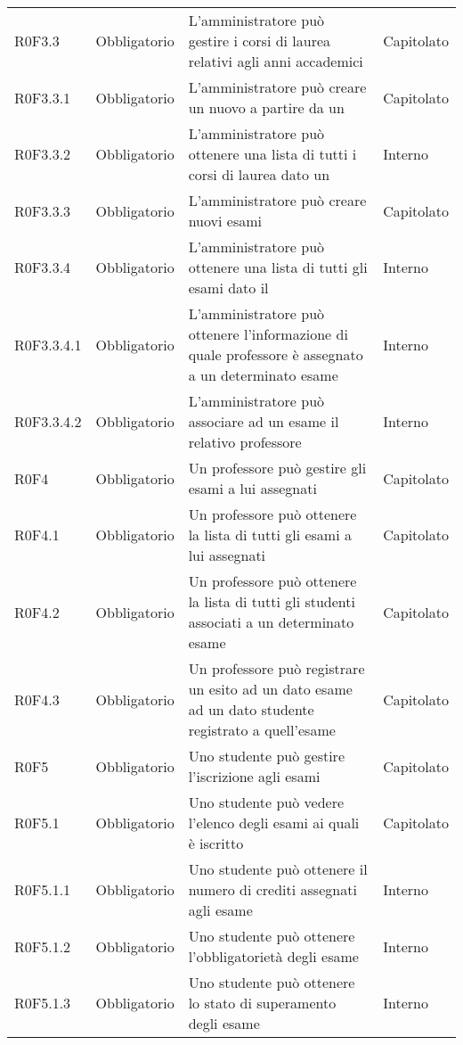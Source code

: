 \documentclass[AnalisiDeiRequisiti.tex]{subfiles}
\begin{document}
\begin{longtable}[H]{p{2.6cm}p{2.5cm}p{5cm}p{2cm}}
	R0F3.3 & Obbligatorio & L'amministratore può gestire i corsi di laurea relativi agli anni accademici & Capitolato \\  
	R0F3.3.1 & Obbligatorio & L'amministratore può creare un nuovo \citGloss{corso di laurea} a partire da un \citGloss{anno accademico} & Capitolato \\  
	R0F3.3.2 & Obbligatorio & L'amministratore può ottenere una lista di tutti i corsi di laurea dato un \citGloss{anno accademico} & Interno \\  
	R0F3.3.3 & Obbligatorio & L'amministratore può creare nuovi esami & Capitolato \\ 
	R0F3.3.4 & Obbligatorio & L'amministratore può ottenere una lista di tutti gli esami dato il \citGloss{corso di laurea} & Interno \\  
	R0F3.3.4.1 & Obbligatorio & L'amministratore può ottenere l'informazione di quale professore è assegnato a un determinato esame & Interno \\  
	R0F3.3.4.2  & Obbligatorio & L'amministratore può associare ad un esame il relativo professore & Interno \\  
	R0F4 & Obbligatorio & Un professore può gestire gli esami a lui assegnati & Capitolato \\  
	R0F4.1 & Obbligatorio & Un professore può ottenere la lista di tutti gli esami a lui assegnati & Capitolato \\  
	R0F4.2 & Obbligatorio & Un professore può ottenere la lista di tutti gli studenti associati a un determinato esame & Capitolato \\  
	R0F4.3 & Obbligatorio & Un professore può registrare un esito ad un dato esame ad un dato studente registrato a quell'esame & Capitolato \\  
	R0F5 & Obbligatorio & Uno studente può gestire l'iscrizione agli esami & Capitolato \\  
	R0F5.1 & Obbligatorio & Uno studente può vedere l'elenco degli esami ai quali è iscritto & Capitolato \\  
	R0F5.1.1 & Obbligatorio & Uno studente può ottenere il numero di crediti assegnati agli esame & Interno \\  
	R0F5.1.2 & Obbligatorio & Uno studente può ottenere l'obbligatorietà degli esame & Interno \\  
	R0F5.1.3 & Obbligatorio & Uno studente può ottenere lo stato di superamento degli esame & Interno \\  

\end{longtable}
\end{document}

